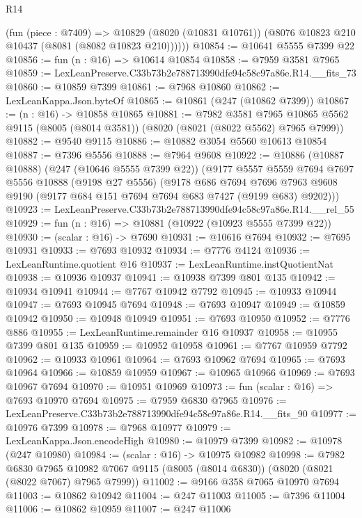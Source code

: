 \begin{lexlean}{R14}
\begin{coremodule}
        (fun (piece : @7409) =>
        @10829 (@8020 (@10831 @10761)) (@8076 @10823 @210 @10437 (@8081 (@8082 @10823 @210))))))
@10854 := @10641 @5555 @7399 @22
@10856 := fun (n : @16) => @10614 @10854
@10858 := @7959 @3581 @7965
@10859 := LexLeanPreserve.C33b73b2e788713990dfe94c58c97a86e.R14.__fits_73
@10860 := @10859 @7399
@10861 := @7968 @10860
@10862 := LexLeanKappa.Json.byteOf
@10865 := @10861 (@247 (@10862 @7399))
@10867 := (n : @16) -> @10858 @10865
@10881 := @7982
    @3581
    @7965
    @10865
    @5562
    @9115
    (@8005 (@8014 @3581))
    (@8020 (@8021 (@8022 @5562) @7965 @7999))
@10882 := @9540 @9115
@10886 := @10882 @3054 @5560 @10613 @10854
@10887 := @7396 @5556
@10888 := @7964 @9608
@10922 := @10886
    (@10887 @10888)
    (@247 (@10646 @5555 @7399 @22))
    (@9177
      @5557
      @5559
      @7694
      @7697
      @5556
      @10888
      (@9198 @27 @5556)
      (@9178
        @686
        @7694
        @7696
        @7963
        @9608
        @9190
        (@9177 @684 @151 @7694 @7694 @683 @7427 (@9199 @683) @9202)))
@10923 := LexLeanPreserve.C33b73b2e788713990dfe94c58c97a86e.R14.__rel_55
@10929 := fun (n : @16) => @10881 (@10922 (@10923 @5555 @7399 @22))
@10930 := (scalar : @16) -> @7690
@10931 := @10616 @7694
@10932 := @7695 @10931
@10933 := @7693 @10932
@10934 := @7776 @4124
@10936 := LexLeanRuntime.quotient @16
@10937 := LexLeanRuntime.instQuotientNat
@10938 := @10936 @10937
@10941 := @10938 @7399 @801 @135
@10942 := @10934 @10941
@10944 := @7767 @10942 @7792
@10945 := @10933 @10944
@10947 := @7693 @10945 @7694
@10948 := @7693 @10947
@10949 := @10859 @10942
@10950 := @10948 @10949
@10951 := @7693 @10950
@10952 := @7776 @886
@10955 := LexLeanRuntime.remainder @16 @10937
@10958 := @10955 @7399 @801 @135
@10959 := @10952 @10958
@10961 := @7767 @10959 @7792
@10962 := @10933 @10961
@10964 := @7693 @10962 @7694
@10965 := @7693 @10964
@10966 := @10859 @10959
@10967 := @10965 @10966
@10969 := @7693 @10967 @7694
@10970 := @10951 @10969
@10973 := fun (scalar : @16) => @7693 @10970 @7694
@10975 := @7959 @6830 @7965
@10976 := LexLeanPreserve.C33b73b2e788713990dfe94c58c97a86e.R14.__fits_90
@10977 := @10976 @7399
@10978 := @7968 @10977
@10979 := LexLeanKappa.Json.encodeHigh
@10980 := @10979 @7399
@10982 := @10978 (@247 @10980)
@10984 := (scalar : @16) -> @10975 @10982
@10998 := @7982
    @6830
    @7965
    @10982
    @7067
    @9115
    (@8005 (@8014 @6830))
    (@8020 (@8021 (@8022 @7067) @7965 @7999))
@11002 := @9166 @358 @7065 @10970 @7694
@11003 := @10862 @10942
@11004 := @247 @11003
@11005 := @7396 @11004
@11006 := @10862 @10959
@11007 := @247 @11006

\end{coremodule}
\end{lexlean}
